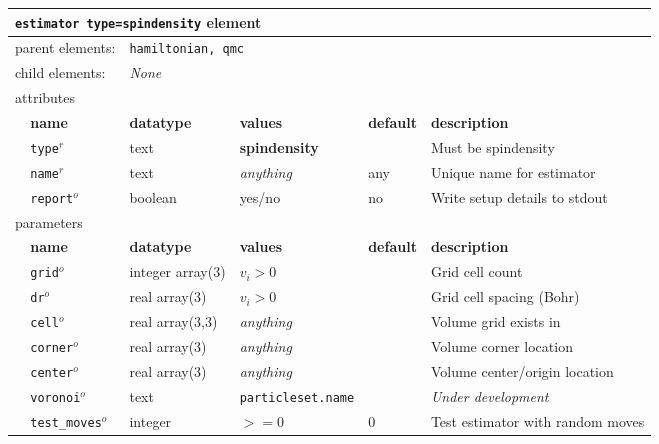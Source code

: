 \FloatBarrier
\begin{table}[h]
\begin{center}
\begin{tabularx}{\textwidth}{l l l l l X }
\hline
\multicolumn{6}{l}{\texttt{estimator type=spindensity} element} \\
\hline
\multicolumn{2}{l}{parent elements:} & \multicolumn{4}{l}{\texttt{hamiltonian, qmc}}\\
\multicolumn{2}{l}{child  elements:} & \multicolumn{4}{l}{\textit{None}}\\
\multicolumn{2}{l}{attributes}  & \multicolumn{4}{l}{}\\
   & \bfseries name       & \bfseries datatype & \bfseries values  & \bfseries default   & \bfseries description \\
   & \texttt{type}$^r$    &  text              & \textbf{spindensity} &                  & Must be spindensity       \\
   & \texttt{name}$^r$    &  text              & \textit{anything}    & any              & Unique name for estimator \\
   & \texttt{report}$^o$  &  boolean           & yes/no               & no               & Write setup details to stdout \\
\multicolumn{2}{l}{parameters}  & \multicolumn{4}{l}{}\\
   & \bfseries name       & \bfseries datatype & \bfseries values  & \bfseries default   & \bfseries description \\
   & \texttt{grid}$^o$      & integer array(3) & $v_i>0$           &                     & Grid cell count       \\
   & \texttt{dr}$^o$        & real array(3)    & $v_i>0$           &                     & Grid cell spacing (Bohr) \\
   & \texttt{cell}$^o$      & real array(3,3)  & \textit{anything} &                     & Volume grid exists in           \\
   & \texttt{corner}$^o$    & real array(3)    & \textit{anything} &                     & Volume corner location  \\
   & \texttt{center}$^o$    & real array(3)    & \textit{anything} &                     & Volume center/origin location \\
   & \texttt{voronoi}$^o$   & text             &\texttt{particleset.name}&               & \textit{Under development}\\%
   & \texttt{test\_moves}$^o$& integer         & $>=0$             & 0                   & Test estimator with random moves  \\
  \hline
\end{tabularx}
\end{center}
\end{table}
\FloatBarrier

